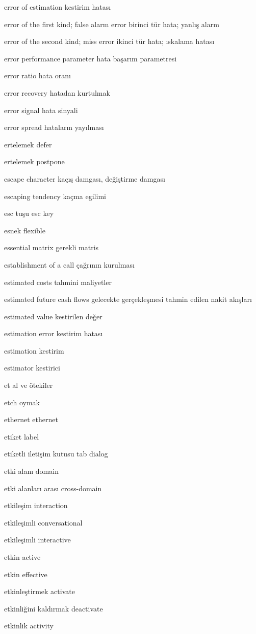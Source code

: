 \documentclass[12pt,fleqn]{article}\usepackage{../../common}
\begin{document}
error of estimation kestirim hatası

error of the first kind; false alarm error birinci tür hata; yanlış alarm

error of the second kind; miss error ikinci tür hata; ıskalama hatası

error performance parameter hata başarım parametresi

error ratio hata oranı

error recovery hatadan kurtulmak

error signal hata sinyali

error spread hataların yayılması

ertelemek defer

ertelemek postpone

escape character kaçış damgası, değiştirme damgası

escaping tendency kaçma egilimi

esc tuşu esc key

esnek flexible

essential matrix gerekli matris

establishment of a call çağrının kurulması

estimated costs tahmini maliyetler

estimated future cash flows gelecekte gerçekleşmesi tahmin edilen nakit akışları

estimated value kestirilen değer

estimation error kestirim hatası

estimation kestirim

estimator kestirici

et al ve ötekiler

etch oymak

ethernet ethernet

etiket label

etiketli iletişim kutusu tab dialog

etki alanı domain

etki alanları arası cross-domain

etkileşim interaction

etkileşimli conversational

etkileşimli interactive

etkin active

etkin effective

etkinleştirmek activate

etkinliğini kaldırmak deactivate

etkinlik activity
\end{document}
